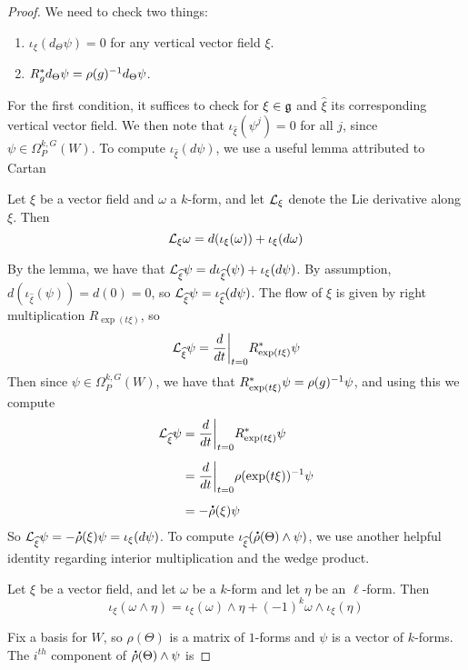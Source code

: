 \begin{proof} %
We need to check two things:
\begin{enumerate}
  \item $\iota_{\xi}(d_\Theta\psi) = 0$ for any vertical vector field $\xi$.
  \item $R_g^*d_\Theta\psi = \rho(g)^{-1} d_\Theta\psi$.
\end{enumerate}
For the first condition, it suffices to check for  $\xi \in \mathfrak{g}$ and
$\widehat{\xi}$ its corresponding vertical vector field.
We then note that $\iota_{\widehat{\xi}}(\psi^j) = 0$ for all $j$, since
$\psi \in \Omega_P^{k,G}(W)$. To compute $\iota_{\widehat{\xi}}(d\psi)$, we use
a useful lemma attributed to Cartan
%
\begin{lem*}
Let $\xi$ be a vector field and $\omega$ a $k$-form, and let $\mathcal{L}_\xi$ denote
the Lie derivative along $\xi$. Then
\[
\mathcal{L}_\xi\omega = d(\iota_\xi(\omega)) + \iota_\xi(d\omega)
\]
\end{lem*}
%
By the lemma, we have that
$\mathcal{L}_{\widehat{\xi}}\psi = d\iota_{\widehat{\xi}}(\psi) + \iota_\xi(d\psi)$.
By assumption, $d(\iota_{\widehat{\xi}}(\psi)) = d(0) = 0$, so
$\mathcal{L}_{\widehat{\xi}}\psi = \iota_{\widehat{\xi}}(d\psi)$.
The flow of $\xi$ is given by right multiplication $R_{\exp(t\xi)}$, so
\[
\mathcal{L}_{\widehat{\xi}}\psi = \frac{d}{dt}\bigg\vert_{t=0}R^*_{\exp(t\xi)}\psi
\]
Then since $\psi \in \Omega^{k,G}_P(W)$, we have that
$R_{\exp(t\xi)}^*\psi = \rho(g)^{-1}\psi$, and using this we compute
\begin{align*}
\mathcal{L}_{\widehat{\xi}}\psi &= \frac{d}{dt}\bigg\vert_{t=0}R^*_{\exp(t\xi)}\psi \\[5pt]
&= \frac{d}{dt}\bigg\vert_{t=0}\rho(\exp(t\xi))^{-1}\psi \\[5pt]
&= -\accentset{\mbox{\large\bfseries .}}{\rho}(\xi)\psi
\end{align*}
So $\mathcal{L}_{\widehat{\xi}}\psi = -\accentset{\mbox{\large\bfseries .}}{\rho}(\xi)\psi = \iota_\xi(d\psi)$. To
compute $\iota_{\widehat{\xi}}(\accentset{\mbox{\large\bfseries .}}{\rho}(\Theta) \wedge \psi)$, we use another
helpful identity regarding interior multiplication and the wedge product.
%
\begin{lem*}
Let $\xi$ be a vector field, and let $\omega$ be a $k$-form and let $\eta$
be an $\ell$-form. Then
\[
\iota_\xi(\omega \wedge \eta) = \iota_\xi(\omega) \wedge \eta
+ (-1)^k\omega \wedge \iota_\xi(\eta)
\]
\end{lem*}
%
Fix a basis for $W$, so $\rho(\Theta)$ is a matrix of $1$-forms and $\psi$
is a vector of $k$-forms. The $i^{th}$ component of
$\accentset{\mbox{\large\bfseries .}}{\rho}(\Theta) \wedge \psi$ is

\end{proof}

